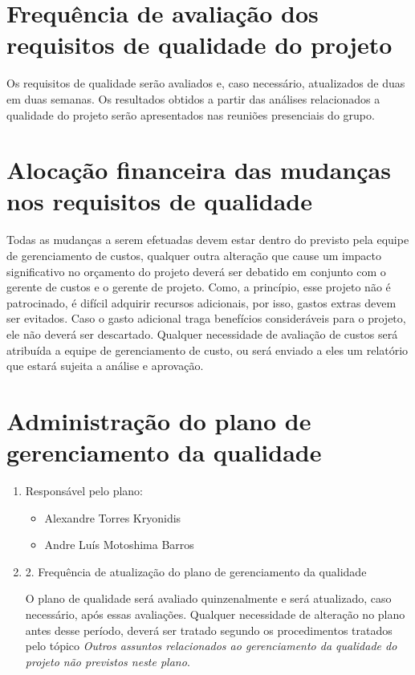    
\section*{Frequência de avaliação dos requisitos de qualidade do projeto}
	Os requisitos de qualidade serão avaliados e, caso necessário, atualizados de duas em duas semanas. Os resultados obtidos a partir das análises relacionados a qualidade do projeto serão apresentados nas reuniões presenciais do grupo.
             
\section*{Alocação financeira das mudanças nos requisitos de qualidade}
        Todas as mudanças a serem efetuadas devem estar dentro do previsto pela equipe de gerenciamento de custos, qualquer outra alteração que cause um impacto significativo no orçamento do projeto deverá ser debatido em conjunto com o gerente de custos e o gerente de projeto. Como, a princípio, esse projeto não é patrocinado, é difícil adquirir recursos adicionais, por isso, gastos extras devem ser evitados. Caso o gasto adicional traga benefícios consideráveis para o projeto, ele não deverá ser descartado. Qualquer necessidade de avaliação de custos será atribuída a equipe de gerenciamento de custo, ou será enviado a eles um relatório que estará sujeita a análise e aprovação.
        
\section*{Administração do plano de gerenciamento da qualidade}

\begin{enumerate}
\item Responsável pelo plano:
\begin{itemize}
\item Alexandre Torres Kryonidis
\item Andre Luís Motoshima Barros
\end{itemize}
\item 2. Frequência de atualização do plano de gerenciamento da qualidade

	O plano de qualidade será avaliado quinzenalmente e será atualizado, caso necessário, após essas avaliações. Qualquer necessidade de alteração no plano antes desse período, deverá ser tratado segundo os procedimentos tratados pelo tópico \textit{Outros assuntos relacionados ao gerenciamento da qualidade do projeto não previstos neste plano}.
\end{enumerate}

